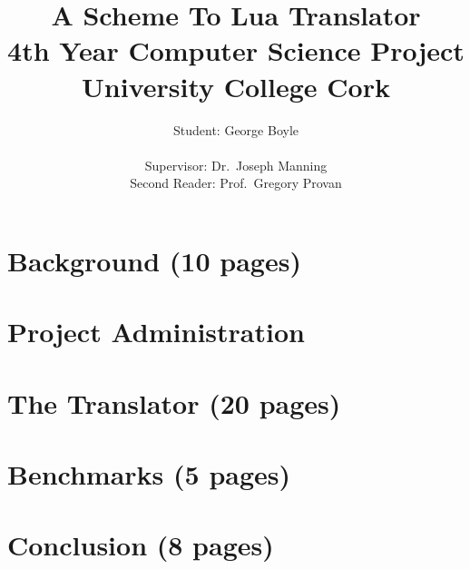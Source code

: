 \documentclass[twoside,a4paper,12pt]{report}
\begin{document}
\title{A Scheme To Lua Translator \\
{\small 4th Year Computer Science Project} \\
{\small University College Cork}}
\author{Student: George Boyle \\ \\
Supervisor: Dr.\ Joseph Manning \\
Second Reader: Prof.\ Gregory Provan}


%
%

\maketitle

\tableofcontents


%
%

\chapter{Background (10 pages)}


\chapter{Project Administration}


\chapter{The Translator (20 pages)}


\chapter{Benchmarks (5 pages)}


\chapter{Conclusion (8 pages)}



%
%


%

%


%
%


\end{document}
